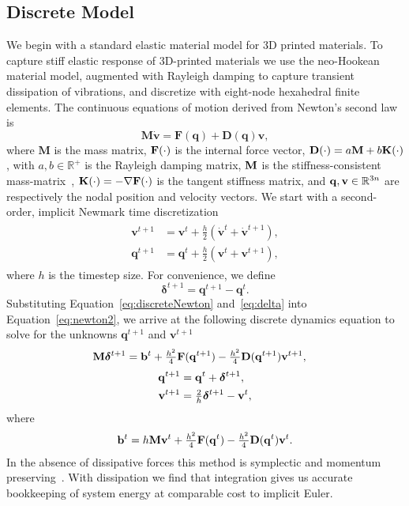 \subsection{Discrete Model}
We begin with a standard elastic material model for 3D printed materials.
To capture stiff elastic response of 3D-printed materials we use the neo-Hookean material model,
augmented with Rayleigh damping to capture transient dissipation of vibrations,
and discretize with eight-node hexahedral finite elements.
The continuous equations of motion derived from Newton's second law is
\begin{equation}
\mathbf{M}\dot{\mathbf{v}} = \mathbf{F}(\mathbf{q}) + \mathbf{D}(\mathbf{q})\mathbf{v},
\label{eq:newton2}
\end{equation}
where $\mathbf{M}$ is the mass matrix, $\mathbf {F}(\cdot)$ is the internal force vector, $\mathbf {D}(\cdot) = a \mathbf {M} + b \mathbf {K}(\cdot)$, 
with $a,b \in \mathbb{R}^+$ is the Rayleigh damping matrix, $\mathbf {M}$ is the stiffness-consistent mass-matrix~\citep{Belytschko:2013tz},
$\mathbf {K}(\cdot) = -\nabla \mathbf {F}(\cdot)$ is the tangent stiffness matrix, 
and $\mathbf {q}, \mathbf {v} \in \mathbb{R}^{3n}$ are respectively the nodal position and velocity vectors.
We start with a second-order, implicit Newmark time discretization 
\begin{align}
\begin{split}
\mathbf{v}^{t+1} &= \mathbf{v}^t + \frac{h}{2}(\dot{\mathbf{v}}^{t} + \dot{\mathbf{v}}^{t+1}),\\
\mathbf{q}^{t+1} &= \mathbf{q}^t + \frac{h}{2}(\mathbf{v}^{t} + \mathbf{v}^{t+1}),
\end{split}
\label{eq:discreteNewton}
\end{align}
where $h$ is the timestep size.
For convenience, we define
\begin{equation}
	\bm{\delta}^{t+1} = \mathbf{q}^{t+1} - \mathbf{q}^{t}.
	\label{eq:delta}
\end{equation}
Substituting Equation~\ref{eq:discreteNewton} and~\ref{eq:delta} into Equation~\ref{eq:newton2}, we arrive at the following
discrete dynamics equation to solve for the unknowns $\mathbf{q}^{t+1}$ and $\mathbf{v}^{t+1}$
\begin{align}
\mathbf {M} \bm{\delta}^{t+1} &= \mathbf {b}^t +  \tfrac{h^2}{4} \mathbf {F}(\mathbf {q}^{t+1}) -\tfrac{h^2}{4} \mathbf {D}(\mathbf {q}^{t+1}) \mathbf {v}^{t+1},
\label{eq:newmark_free}
\end{align}
\begin{align}
\begin{split}
\mathbf {q}^{t+1} &= \mathbf {q}^t + \bm{\delta}^{t+1},\\
\mathbf {v}^{t+1} &= \tfrac{2}{h} \bm{\delta}^{t+1} - \mathbf {v}^t,
\end{split}
\label{eq:newmark_free_update}
\end{align}
where
\begin{align}
\mathbf {b}^t = h \mathbf {M} \mathbf {v}^t + \tfrac{h^2}{4} \mathbf {F}( \mathbf {q}^t) -\tfrac{h^2}{4} \mathbf {D}( \mathbf {q}^t) \mathbf {v}^t.
\label{eq:newmark_predictor}
\end{align}
In the absence of dissipative forces this method is symplectic and momentum preserving~\citep{Kane:2000dw}.
With dissipation we find that integration gives us accurate bookkeeping of system energy at comparable cost to implicit Euler. 

